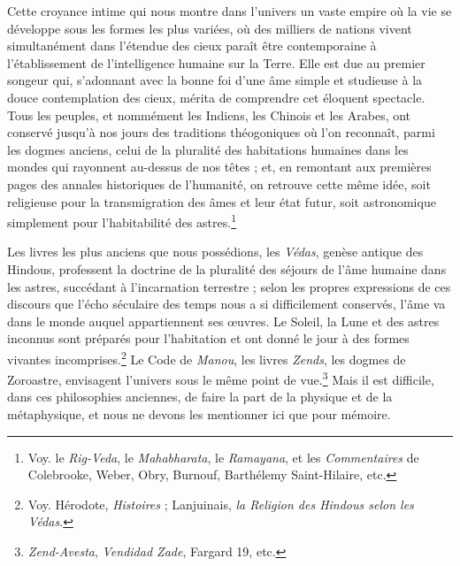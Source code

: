 \documentclass[a4paper, 11pt, oneside]{article}
\begin{document}
Cette croyance intime qui nous montre dans l'univers un vaste empire où la vie se développe sous les formes les plus variées, où des milliers de nations vivent simultanément dans l'étendue des cieux paraît être contemporaine à l'établissement de l'intelligence humaine sur la Terre. Elle est due au premier songeur qui, s'adonnant avec la bonne foi d'une âme simple et studieuse à la douce contemplation des cieux, mérita de comprendre cet éloquent spectacle. Tous les peuples, et nommément les Indiens, les Chinois et les Arabes, ont conservé jusqu'à nos jours des traditions théogoniques où l'on reconnaît, parmi les dogmes anciens, celui de la pluralité des habitations humaines dans les mondes qui rayonnent au-dessus de nos têtes ; et, en remontant aux premières pages des annales historiques de l'humanité, on retrouve cette même idée, soit religieuse pour la transmigration des âmes et leur état futur, soit astronomique simplement pour l'habitabilité des astres.\footnote{Voy. le \emph{Rig-Veda}, le \emph{Mahabharata}, le \emph{Ramayana}, et les \emph{Commentaires} de Colebrooke, Weber, Obry, Burnouf, Barthélemy Saint-Hilaire, etc.}

Les livres les plus anciens que nous possédions, les \emph{Védas}, genèse antique des Hindous, professent la doctrine de la pluralité des séjours de l'âme humaine dans les astres, succédant à l'incarnation terrestre ; selon les propres expressions de ces discours que l'écho séculaire des temps nous a si difficilement conservés, l'âme va dans le monde auquel appartiennent ses œuvres. Le Soleil, la Lune et des astres inconnus sont préparés pour l'habitation et ont donné le jour à des formes vivantes incomprises.\footnote{Voy. Hérodote, \emph{Histoires} ; Lanjuinais, \emph{la Religion des Hindous selon les Védas}.} Le Code de \emph{Manou}, les livres \emph{Zends}, les dogmes de Zoroastre, envisagent l'univers sous le même point de vue.\footnote{\emph{Zend-Avesta}, \emph{Vendidad Zade}, Fargard 19, etc.} Mais il est difficile, dans ces philosophies anciennes, de faire la part de la physique et de la métaphysique, et nous ne devons les mentionner ici que pour mémoire.
\end{document}
